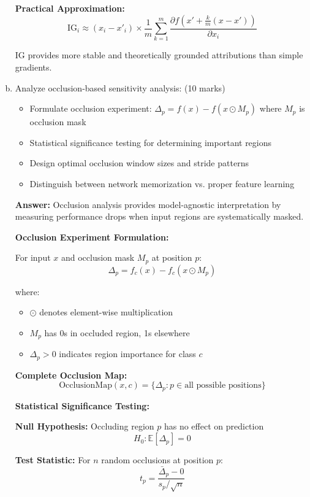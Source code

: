 \documentclass[12pt]{article}
\newcommand{\answer}[1]{{\color{answercolor}\textbf{Answer:} #1}}
\newcommand{\explanation}[1]{{\color{explanationcolor}#1}}
\begin{document}
\begin{enumerate}[(a)]
{    \textbf{Practical Approximation:}
    $$\text{IG}_i \approx (x_i - x'_i) \times \frac{1}{m} \sum_{k=1}^m \frac{\partial f(x' + \frac{k}{m}(x-x'))}{\partial x_i}$$
    
    IG provides more stable and theoretically grounded attributions than simple gradients.
    }
    
    \item Analyze occlusion-based sensitivity analysis: \hfill (10 marks)
    \begin{itemize}
        \item Formulate occlusion experiment: $\Delta_p = f(x) - f(x \odot M_p)$ where $M_p$ is occlusion mask
        \item Statistical significance testing for determining important regions
        \item Design optimal occlusion window sizes and stride patterns
        \item Distinguish between network memorization vs. proper feature learning
    \end{itemize}
    
    \answer{Occlusion analysis provides model-agnostic interpretation by measuring performance drops when input regions are systematically masked.}
    
    \explanation{
    \textbf{Occlusion Experiment Formulation:}
    
    For input $x$ and occlusion mask $M_p$ at position $p$:
    $$\Delta_p = f_c(x) - f_c(x \odot M_p)$$
    
    where:
    \begin{itemize}
        \item $\odot$ denotes element-wise multiplication
        \item $M_p$ has 0s in occluded region, 1s elsewhere
        \item $\Delta_p > 0$ indicates region importance for class $c$
    \end{itemize}
    
    \textbf{Complete Occlusion Map:}
    $$\text{OcclusionMap}(x, c) = \{\Delta_p : p \in \text{all possible positions}\}$$
    
    \textbf{Statistical Significance Testing:}
    
    \textbf{Null Hypothesis:} Occluding region $p$ has no effect on prediction
    $$H_0: \mathbb{E}[\Delta_p] = 0$$
    
    \textbf{Test Statistic:} For $n$ random occlusions at position $p$:
    $$t_p = \frac{\bar{\Delta}_p - 0}{s_p / \sqrt{n}}$$
    
}
\end{enumerate}
\end{document}
